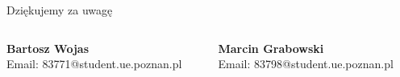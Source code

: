 \begin{frame}
    \centering
    \Large Dziękujemy za uwagę
    
    \vfill
    \begin{columns}[c]
        \begin{column}{0.5\textwidth}
            \small
            \textbf{Bartosz Wojas}\\
            Email: 83771@student.ue.poznan.pl\\
        \end{column}
        \begin{column}{0.5\textwidth}
            \small
            \textbf{Marcin Grabowski}\\
            Email: 83798@student.ue.poznan.pl\\
        \end{column}
    \end{columns}
    
    \vspace{1em}
\end{frame}
